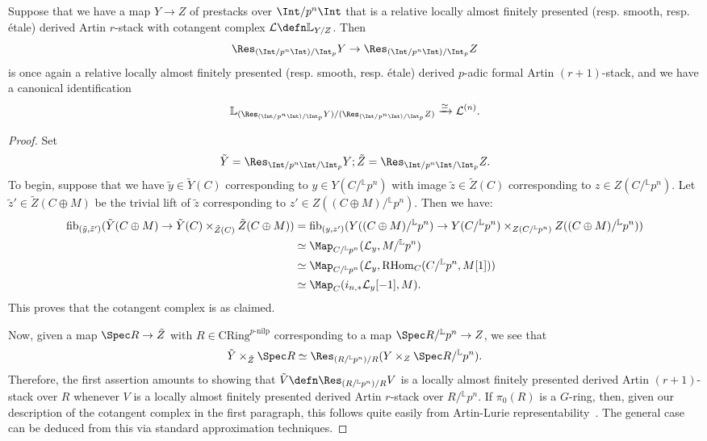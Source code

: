 \documentclass[10pt]{amsart}
\begin{document}
\begin{proposition}
\label{prop:weil_restriction}
Suppose that we have a map $Y\to Z$ of prestacks over $\Int/p^n\Int$ that is a relative locally almost finitely presented (resp. smooth, resp. \'etale) derived Artin $r$-stack with cotangent complex $\mathcal{L} \defn \mathbb{L}_{Y/Z}$. Then 
\[
\Res_{(\Int/p^n\Int)/\Int_p}Y\to \Res_{(\Int/p^n\Int)/\Int_p}Z
\]
is once again a relative locally almost finitely presented (resp. smooth, resp. \'etale) derived $p$-adic formal Artin $(r+1)$-stack, and we have a canonical identification
\[
\mathbb{L}_{(\Res_{(\Int/p^n\Int)/\Int_p}Y)/(\Res_{(\Int/p^n\Int)/\Int_p}Z)} \xrightarrow{\simeq}\mathcal{L}^{(n)}.
\]
\end{proposition}
\begin{proof}
Set 
\[
\tilde{Y} = \Res_{\Int/p^n\Int/\Int_p}Y; \tilde{Z} =  \Res_{\Int/p^n\Int/\Int_p}Z.
\]
To begin, suppose that we have $\tilde{y}\in\tilde{Y}(C)$ corresponding to $y\in Y(C/{}^{\mathbb{L}}p^n)$ with image $\tilde{z}\in \tilde{Z}(C)$ corresponding to $z\in Z(C/{}^{\mathbb{L}}p^n)$. Let $\tilde{z}'\in \tilde{Z}(C\oplus M)$ be the trivial lift of $\tilde{z}$ corresponding to $z'\in Z((C\oplus M)/{}^{\mathbb{L}}p^n)$. Then we have:
\begin{align*}
\mathrm{fib}_{(\tilde{y},\tilde{z}')}(\tilde{Y}(C\oplus M)\to \tilde{Y}(C)\times_{\tilde{Z}(C)}\tilde{Z}(C\oplus M)) & = \mathrm{fib}_{(y,z')}(Y((C\oplus M)/{}^{\mathbb{L}}p^n)\to Y(C/{}^{\mathbb{L}}p^n)\times_{Z(C/{}^{\mathbb{L}}p^n)}Z((C\oplus M)/{}^{\mathbb{L}}p^n))\\
&\simeq \Map_{C/{}^{\mathbb{L}}p^n}(\mathcal{L}_y,M/{}^{\mathbb{L}}p^n)\\
&\simeq \Map_{C/{}^{\mathbb{L}}p^n}(\mathcal{L}_y,\mathrm{RHom}_{C}(C/{}^{\mathbb{L}}p^n,M[1]))\\
&\simeq \Map_{{C}}(i_{n,*}\mathcal{L}_y[-1],M).
\end{align*}
This proves that the cotangent complex is as claimed.

Now, given a map $\Spec R\to \tilde{Z}$ with $R\in \mathrm{CRing}^{p\text{-nilp}}$ corresponding to a map $\Spec R/{}^{\mathbb{L}}p^n\to Z$, we see that
\[
\tilde{Y}\times_{\tilde{Z}}\Spec R \simeq \Res_{(R/{}^{\mathbb{L}}p^n)/R}(Y\times_Z\Spec R/{}^{\mathbb{L}}p^n).
\]
Therefore, the first assertion amounts to showing that $\tilde{V} \defn \Res_{(R/{}^{\mathbb{L}}p^n)/R}V$ is a locally almost finitely presented derived Artin $(r+1)$-stack over $R$ whenever $V$ is a locally almost finitely presented derived Artin $r$-stack over $R/{}^{\mathbb{L}}p^n$. If $\pi_0(R)$ is a $G$-ring, then, given our description of the cotangent complex in the first paragraph, this follows quite easily from Artin-Lurie representability~\cite[Theorem 7.1.6]{lurie_thesis}. The general case can be deduced from this via standard approximation techniques.


\end{proof}
\end{document}
